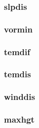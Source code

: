 \subsubsection{slpdis}
\subsubsection{vormin}
\subsubsection{temdif}
\subsubsection{temdis}
\subsubsection{winddis}
\subsubsection{maxhgt}





